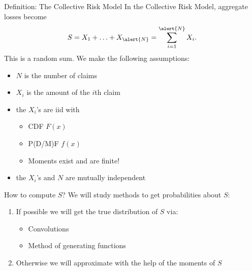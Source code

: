 \documentclass[11pt]{beamer}
\begin{document}
\begin{frame}{Definition: The Collective Risk Model}
In the Collective Risk Model, aggregate losses become
$$S=X_{1}+\ldots +X_{\alert{N}}=\sum_{i=1}^{\alert{N}}X_{i}.$$
This is a random sum. We make the following assumptions:
\begin{itemize}
\item $N$ is the number of claims
\item $X_i$ is the amount of the $i$th claim
\item the $X_i$'s are \alert{iid} with
\begin{itemize}
\item CDF $F(x)$
\item P(D/M)F $f(x)$
\item Moments exist and are finite!
\end{itemize}
\item the $X_i$'s and $N$ are mutually independent
\end{itemize}
\end{frame}
\begin{frame}{How to compute $S$?}
We will study methods to get probabilities about $S$:
\vfill
\begin{enumerate}

  \item If possible we will get the true distribution of $S$ via:
  
    \begin{itemize}
    \item Convolutions
    \item Method of generating functions
    \end{itemize}
    \vfill
  \item Otherwise we will approximate with the help of the moments of $S$
  
\end{enumerate}

\end{frame}
\end{document}
